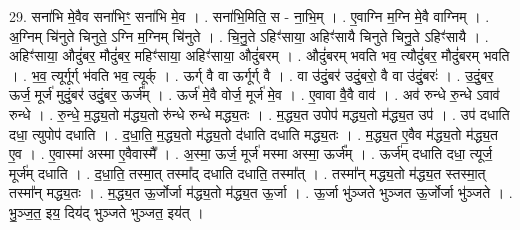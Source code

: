 \documentclass[17pt]{extarticle}
\begin{document}
29. सना॑भि मे॒वैव सना॑भिꣳ॒॒ सना॑भि मे॒व । . सना॑भि॒मिति॒ स - ना॒भि॒म् । . ए॒वाग्नि म॒ग्नि मे॒वै वाग्निम् । . अ॒ग्निम् चि॑नुते चिनुते॒ ऽग्नि म॒ग्निम् चि॑नुते । . चि॒नु॒ते ऽहिꣳ॑साया॒ अहिꣳ॑सायै चिनुते चिनु॒ते ऽहिꣳ॑सायै । . अहिꣳ॑साया॒ औदुं॑बर॒ मौदुं॑बर॒ महिꣳ॑साया॒ अहिꣳ॑साया॒ औदुं॑बरम् । . औदुं॑बरम् भवति भव॒ त्यौदुं॑बर॒ मौदुं॑बरम् भवति । . भ॒व॒ त्यूर्गूर्ग् भ॑वति भव॒ त्यूर्क् । . ऊर्ग् वै वा ऊर्गूर्ग् वै । . वा उ॑दुं॒बर॑ उदुं॒बरो॒ वै वा उ॑दुं॒बरः॑ । . उ॒दुं॒बर॒ ऊर्ज॒ मूर्ज॑ मुदुं॒बर॑ उदुं॒बर॒ ऊर्ज᳚म् । . ऊर्ज॑ मे॒वै वोर्ज॒ मूर्ज॑ मे॒व । . ए॒वावा वै॒वै वाव॑ । . अव॑ रुन्धे रु॒न्धे ऽवाव॑ रुन्धे । . रु॒न्धे॒ म॒द्ध्य॒तो म॑द्ध्य॒तो रु॑न्धे रुन्धे मद्ध्य॒तः । . म॒द्ध्य॒त उपोप॑ मद्ध्य॒तो म॑द्ध्य॒त उप॑ । . उप॑ दधाति दधा॒ त्युपोप॑ दधाति । . द॒धा॒ति॒ म॒द्ध्य॒तो म॑द्ध्य॒तो द॑धाति दधाति मद्ध्य॒तः । . म॒द्ध्य॒त ए॒वैव म॑द्ध्य॒तो म॑द्ध्य॒त ए॒व । . ए॒वास्मा॑ अस्मा ए॒वैवास्मै᳚ । . अ॒स्मा॒ ऊर्ज॒ मूर्ज॑ मस्मा अस्मा॒ ऊर्ज᳚म् । . ऊर्ज॑म् दधाति दधा॒ त्यूर्ज॒ मूर्ज॑म् दधाति । . द॒धा॒ति॒ तस्मा॒त् तस्मा᳚द् दधाति दधाति॒ तस्मा᳚त् । . तस्मा᳚न् मद्ध्य॒तो म॑द्ध्य॒त स्तस्मा॒त् तस्मा᳚न् मद्ध्य॒तः । . म॒द्ध्य॒त ऊ॒र्जोर्जा म॑द्ध्य॒तो म॑द्ध्य॒त ऊ॒र्जा । . ऊ॒र्जा भु॑ञ्जते भुञ्जत ऊ॒र्जोर्जा भु॑ञ्जते । . भु॒ञ्ज॒त॒ इय॒ दिय॑द् भुञ्जते भुञ्जत॒ इय॑त् । \newline
\end{document}
